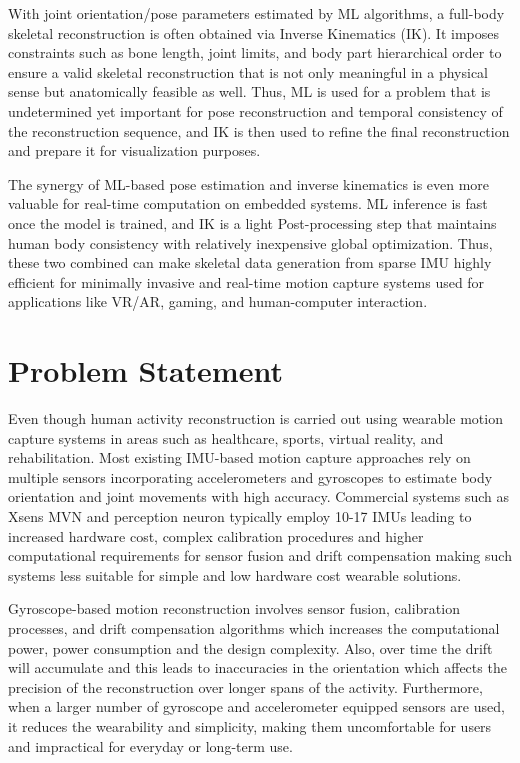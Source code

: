 \documentclass[12pt, a4paper, oneside]{report}
\begin{document}
\noindent With joint orientation/pose parameters estimated by \ac{ML} algorithms, a full-body skeletal reconstruction is often obtained via Inverse Kinematics (\ac{IK}). It imposes constraints such as bone length, joint limits, and body part hierarchical order to ensure a valid skeletal reconstruction that is not only meaningful in a physical sense but anatomically feasible as well. Thus, \ac{ML} is used for a problem that is undetermined yet important for pose reconstruction and temporal consistency of the reconstruction sequence, and \ac{IK} is then used to refine the final reconstruction and prepare it for visualization purposes.\vspace{\baselineskip}

\noindent The synergy of \ac{ML}-based pose estimation and inverse kinematics is even more valuable for real-time computation on embedded systems. \ac{ML} inference is fast once the model is trained, and \ac{IK} is a light Post-processing step that maintains human body consistency with relatively inexpensive global optimization. Thus, these two combined can make skeletal data generation from sparse \ac{IMU} highly efficient for minimally invasive and real-time motion capture systems used for applications like \ac{VR}/\ac{AR}, gaming, and human-computer interaction\cite{xiao2024fast}.
\vspace{\baselineskip}


\section{Problem Statement}

\noindent Even though human activity reconstruction is carried out using wearable motion capture systems in areas such as healthcare, sports, virtual reality, and rehabilitation. Most existing \ac{IMU}-based motion capture approaches rely on multiple sensors incorporating accelerometers and gyroscopes to estimate body orientation and joint movements with high accuracy. Commercial systems such as Xsens MVN and perception neuron typically employ 10-17 \ac{IMU}s leading to increased hardware cost, complex calibration procedures and higher computational requirements for sensor fusion and drift compensation making such systems less suitable for simple and low hardware cost wearable solutions.\vspace{\baselineskip}

\noindent Gyroscope-based motion reconstruction involves sensor fusion, calibration processes, and drift compensation algorithms which increases the computational power, power consumption and the design complexity. Also, over time the drift will accumulate and this leads to inaccuracies in the orientation which affects the precision of the reconstruction over longer spans of the activity. Furthermore, when a larger number of gyroscope and accelerometer equipped sensors are used, it reduces the wearability and simplicity, making them uncomfortable for users and impractical for everyday or long-term use.\vspace{\baselineskip}
\end{document}
